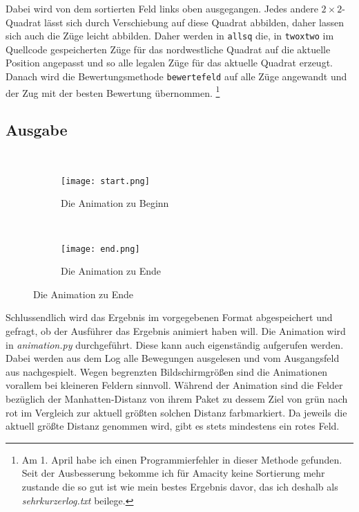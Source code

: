 \documentclass[12pt]{article}
\begin{document}
Dabei wird von dem sortierten Feld links oben ausgegangen. Jedes andere $2\times2$-Quadrat lässt sich durch Verschiebung auf diese Quadrat abbilden, daher lassen sich auch die Züge leicht abbilden. Daher werden in \texttt{allsq} die, in \texttt{twoxtwo} im Quellcode gespeicherten Züge für das nordwestliche Quadrat auf die aktuelle Position angepasst und so alle legalen Züge für das aktuelle Quadrat erzeugt. Danach wird die Bewertungsmethode \texttt{bewertefeld} auf alle Züge angewandt und der Zug mit der besten Bewertung übernommen. \footnote{Am 1. April habe ich einen Programmierfehler in dieser Methode gefunden. Seit der Ausbesserung bekomme ich für Amacity keine Sortierung mehr zustande die so gut ist wie mein bestes Ergebnis davor, das ich deshalb als \textit{sehrkurzerlog.txt} beilege.}

\subsection{Ausgabe}
\ 
\begin{figure}[h]
\centering
\begin{subfigure}[b]{0.3\textwidth}
 \texttt{[image: start.png]}
 \caption{Die Animation zu Beginn}
 \end{subfigure}
 ~
 \begin{subfigure}[b]{0.3\textwidth}
  \texttt{[image: end.png]}
  \caption{Die Animation zu Ende}
  \end{subfigure}
\end{figure}

Schlussendlich wird das Ergebnis im vorgegebenen Format abgespeichert und gefragt, ob der Ausführer das Ergebnis animiert haben will. Die Animation wird in \textit{animation.py} durchgeführt. Diese kann auch eigenständig aufgerufen werden. Dabei werden aus dem Log alle Bewegungen ausgelesen und vom Ausgangsfeld aus nachgespielt. Wegen begrenzten Bildschirmgrößen sind die Animationen vorallem bei kleineren Feldern sinnvoll. Während der Animation sind die Felder bezüglich der Manhatten-Distanz von ihrem Paket zu dessem Ziel von grün nach rot im Vergleich zur aktuell größten solchen Distanz farbmarkiert. Da jeweils die aktuell größte Distanz genommen wird, gibt es stets mindestens ein rotes Feld. 
\end{document}
